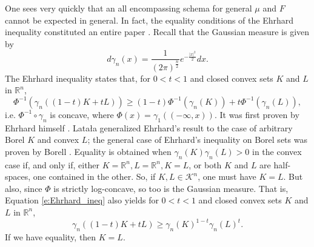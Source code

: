 \documentclass[11pt]{amsart}
\theoremstyle{definition}
\theoremstyle{remark}
\numberwithin{equation}{section}
\newcommand{\R}{\mathbb{R}}
\newcommand{\conbod}{\mathcal{K}^n}
\begin{document}
	One sees very quickly that an all encompassing schema for general $\mu$ and $F$ cannot be expected in general. In fact, the equality conditions of the Ehrhard inequality constituted an entire paper \cite{EHR2}. Recall that the Gaussian measure is given by $$d\gamma_n(x)=\frac{1}{(2\pi)^{\frac{n}{2}}}  e^{-\frac{|x|^2}{2}} dx.$$  The Ehrhard inequality states that, for $0<t<1$ and closed convex sets $K$ and $L$ in $\R^{n}$,
\begin{equation}\label{e:Ehrhard_ineq}
\Phi^{-1}\left(\gamma_{n}((1-t) K+tL)\right) \geq(1-t) \Phi^{-1}\left(\gamma_{n}(K)\right)+t \Phi^{-1}\left(\gamma_{n}(L)\right),
\end{equation}
i.e. $\Phi^{-1}\circ\gamma_n$ is concave, where $\Phi(x)=\gamma_{1}((-\infty, x))$. It was first proven by Ehrhard himself \cite{EHR1,EHR2}.  Lata\l{}a \cite{Lat96} generalized Ehrhard’s result to the case of arbitrary Borel $K$ and convex $L$; the general case of Ehrhard's inequality on Borel sets was proven by Borell \cite{Bor03}. Equality is obtained when $\gamma_{n}(K) \gamma_{n}(L)>0$ in the convex case if, and only if, either $K=\R^{n}, L=\R^{n}, K=L$, or both $K$ and $L$ are half-spaces, one contained in the other. So, if $K,L\in\conbod$, one must have $K=L.$ But also, since $\Phi$ is strictly log-concave, so too is the Gaussian measure. That is, Equation \ref{e:Ehrhard_ineq} also yields for $0<t<1$ and closed convex sets $K$ and $L$ in $\R^{n}$,
\begin{equation}\label{e:Log_gamma_concave}
\gamma_{n}((1-t) K+t L) \geq \gamma_{n}(K)^{1-t} \gamma_{n}(L)^{t}.
\end{equation}
If we have equality, then $K=L.$ 
	
\end{document}
